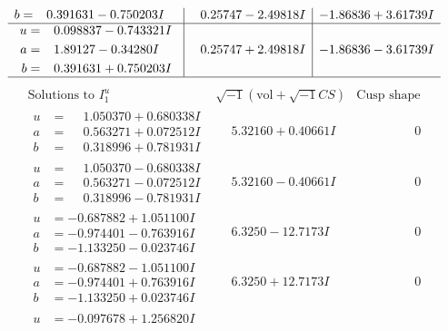 \documentclass[1p]{elsarticle_modified}
\theoremstyle{definition}
\newcommand{\I}{\sqrt{-1}}
\begin{document}
$$\begin{array}{c|c|c}
\begin{aligned}
b &= \phantom{-}0.391631 - 0.750203 I\end{aligned}
 & \phantom{-}0.25747 - 2.49818 I & -1.86836 + 3.61739 I \\ \hline\begin{aligned}
u &= \phantom{-}0.098837 - 0.743321 I \\
a &= \phantom{-}1.89127 - 0.34280 I \\
b &= \phantom{-}0.391631 + 0.750203 I\end{aligned}
 & \phantom{-}0.25747 + 2.49818 I & -1.86836 - 3.61739 I\\
 \hline 
 \end{array}$$\newpage$$\begin{array}{c|c|c}  
\text{Solutions to }I^u_{1}& \I (\text{vol} + \sqrt{-1}CS) & \text{Cusp shape}\\
 \hline 
\begin{aligned}
u &= \phantom{-}1.050370 + 0.680338 I \\
a &= \phantom{-}0.563271 + 0.072512 I \\
b &= \phantom{-}0.318996 + 0.781931 I\end{aligned}
 & \phantom{-}5.32160 + 0.40661 I & \phantom{-0.000000 } 0 \\ \hline\begin{aligned}
u &= \phantom{-}1.050370 - 0.680338 I \\
a &= \phantom{-}0.563271 - 0.072512 I \\
b &= \phantom{-}0.318996 - 0.781931 I\end{aligned}
 & \phantom{-}5.32160 - 0.40661 I & \phantom{-0.000000 } 0 \\ \hline\begin{aligned}
u &= -0.687882 + 1.051100 I \\
a &= -0.974401 - 0.763916 I \\
b &= -1.133250 - 0.023746 I\end{aligned}
 & \phantom{-}6.3250 - 12.7173 I & \phantom{-0.000000 } 0 \\ \hline\begin{aligned}
u &= -0.687882 - 1.051100 I \\
a &= -0.974401 + 0.763916 I \\
b &= -1.133250 + 0.023746 I\end{aligned}
 & \phantom{-}6.3250 + 12.7173 I & \phantom{-0.000000 } 0 \\ \hline\begin{aligned}
u &= -0.097678 + 1.256820 I \\

\end{aligned}
\end{array}$$
\end{document}
